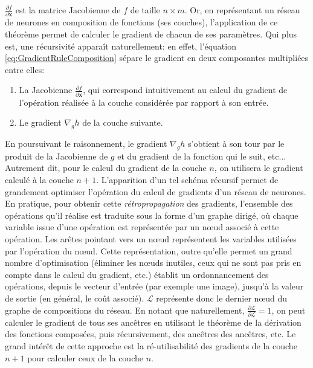 $\frac{\partial f}{\partial \mathbf{x}}$ est la matrice Jacobienne de $f$ de taille $n \times m$.
Or, en représentant un réseau de neurones en composition de fonctions (ses couches), l'application de ce théorème permet de calculer le gradient de chacun de ses paramètres. Qui plus est, une récursivité apparaît naturellement: en effet, l'équation \ref{eq:GradientRuleComposition} sépare le gradient en deux composantes multipliées entre elles:
\begin{enumerate}
	\item La Jacobienne $\frac{\partial f}{\partial \mathbf{x}}$, qui correspond intuitivement au calcul du gradient de l'opération réalisée à la couche considérée par rapport à son entrée.
	\item Le gradient $\nabla_{g} h$ de la couche suivante.
\end{enumerate}
En poursuivant le raisonnement, le gradient $\nabla_{g} h$ s'obtient à son tour par le produit de la Jacobienne de $g$ et du gradient de la fonction qui le suit, etc... Autrement dit, pour le calcul du gradient de la couche $n$, on utilisera le gradient calculé à la couche $n+1$. L'apparition d'un tel schéma récursif permet de grandement optimiser l'opération du calcul de gradients d'un réseau de neurones. En pratique, pour obtenir cette \textit{rétropropagation} des gradients, l'ensemble des opérations qu'il réalise est traduite sous la forme d'un graphe dirigé, où chaque variable issue d'une opération est représentée par un n\oe ud associé à cette opération. Les arêtes pointant vers un n\oe ud représentent les variables utilisées par l'opération du n\oe ud. Cette représentation, outre qu'elle permet un grand nombre d'optimisation (éliminer les n\oe uds inutiles, ceux qui ne sont pas pris en compte dans le calcul du gradient, etc.) établit un ordonnancement des opérations, depuis le vecteur d'entrée (par exemple une image), jusqu'à la valeur de sortie (en général, le coût associé).  $\mathcal{L}$ représente donc le dernier n\oe ud du graphe de compositions du réseau. En notant que naturellement, $\frac{\partial \mathcal{L}}{\partial \mathcal{L}} = 1$, on peut calculer le gradient de tous ses ancêtres en utilisant le théorème de la dérivation des fonctions composées, puis récursivement, des ancêtres des ancêtres, etc. Le grand intérêt de cette approche est la ré-utilisabilité des gradients de la couche $n+1$ pour calculer ceux de la couche $n$.

